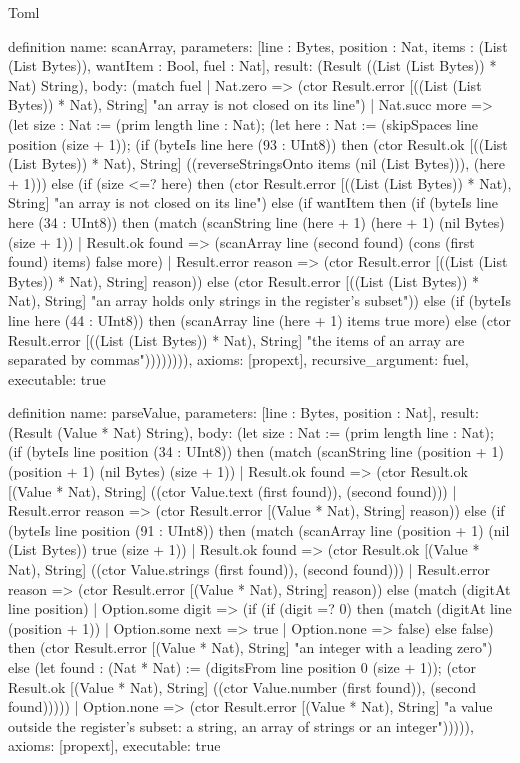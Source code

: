 \begin{lexlean}{Toml}
\begin{semanticmodule}
definition{
  name: scanArray,
  parameters: [line : Bytes, position : Nat, items : (List (List Bytes)), wantItem : Bool, fuel : Nat],
  result: (Result ((List (List Bytes)) * Nat) String),
  body: (match fuel
    | Nat.zero => (ctor Result.error [((List (List Bytes)) * Nat), String] "an array is not closed on its line")
    | Nat.succ more => (let size : Nat := (prim length line : Nat); (let here : Nat := (skipSpaces line position (size + 1)); (if (byteIs line here (93 : UInt8)) then (ctor Result.ok [((List (List Bytes)) * Nat), String] ((reverseStringsOnto items (nil (List Bytes))), (here + 1))) else (if (size <=? here) then (ctor Result.error [((List (List Bytes)) * Nat), String] "an array is not closed on its line") else (if wantItem then (if (byteIs line here (34 : UInt8)) then (match (scanString line (here + 1) (here + 1) (nil Bytes) (size + 1))
      | Result.ok found => (scanArray line (second found) (cons (first found) items) false more)
      | Result.error reason => (ctor Result.error [((List (List Bytes)) * Nat), String] reason)) else (ctor Result.error [((List (List Bytes)) * Nat), String] "an array holds only strings in the register's subset")) else (if (byteIs line here (44 : UInt8)) then (scanArray line (here + 1) items true more) else (ctor Result.error [((List (List Bytes)) * Nat), String] "the items of an array are separated by commas")))))))),
  axioms: [propext],
  recursive_argument: fuel,
  executable: true
}

definition{
  name: parseValue,
  parameters: [line : Bytes, position : Nat],
  result: (Result (Value * Nat) String),
  body: (let size : Nat := (prim length line : Nat); (if (byteIs line position (34 : UInt8)) then (match (scanString line (position + 1) (position + 1) (nil Bytes) (size + 1))
    | Result.ok found => (ctor Result.ok [(Value * Nat), String] ((ctor Value.text (first found)), (second found)))
    | Result.error reason => (ctor Result.error [(Value * Nat), String] reason)) else (if (byteIs line position (91 : UInt8)) then (match (scanArray line (position + 1) (nil (List Bytes)) true (size + 1))
    | Result.ok found => (ctor Result.ok [(Value * Nat), String] ((ctor Value.strings (first found)), (second found)))
    | Result.error reason => (ctor Result.error [(Value * Nat), String] reason)) else (match (digitAt line position)
    | Option.some digit => (if (if (digit =? 0) then (match (digitAt line (position + 1))
        | Option.some next => true
        | Option.none => false) else false) then (ctor Result.error [(Value * Nat), String] "an integer with a leading zero") else (let found : (Nat * Nat) := (digitsFrom line position 0 (size + 1)); (ctor Result.ok [(Value * Nat), String] ((ctor Value.number (first found)), (second found)))))
    | Option.none => (ctor Result.error [(Value * Nat), String] "a value outside the register's subset: a string, an array of strings or an integer"))))),
  axioms: [propext],
  executable: true
}


\end{semanticmodule}
\end{lexlean}
